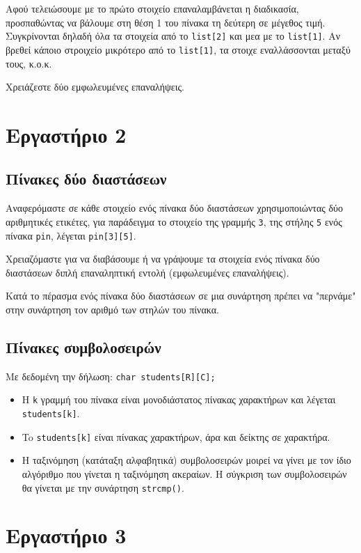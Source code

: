 \documentclass[14pt, fleqn, leqno]{extreport}
\begin{document}
Αφού τελειώσουμε με το πρώτο στοιχείο επαναλαμβάνεται η διαδικασία, προσπαθώντας να βάλουμε στη θέση 1 του πίνακα τη δεύτερη σε μέγεθος τιμή. Συγκρίνονται δηλαδή όλα τα στοιχεία από το \lstinline{list[2]} και μεα με το \lstinline{list[1]}. Αν βρεθεί κάποιο στροιχείο μικρότερο από το \lstinline{list[1]}, τα στοιχε εναλλάσσονται μεταξύ τους, κ.ο.κ.

Χρειάζεστε δύο εμφωλευμένες επαναλήψεις.

\chapter{Εργαστήριο 2}

\section{Πίνακες δύο διαστάσεων}

Αναφερόμαστε σε κάθε στοιχείο ενός πίνακα δύο διαστάσεων χρησιμοποιώντας δύο αριθμητικές ετικέτες, για παράδειγμα το στοιχείο της γραμμής \lstinline{3}, της στήλης \lstinline{5} ενός πίνακα \lstinline{pin}, λέγεται \lstinline{pin[3][5]}.

Χρειαζόμαστε για να διαβάσουμε ή να γράψουμε τα στοιχεία ενός πίνακα δύο διαστάσεων διπλή επαναληπτική εντολή (εμφωλευμένες επαναλήψεις).

Κατά το πέρασμα ενός πίνακα δύο διαστάσεων σε μια συνάρτηση πρέπει να "περνάμε" στην συνάρτηση τον αριθμό των στηλών του πίνακα.

\section{Πίνακες συμβολοσειρών}

Με δεδομένη την δήλωση: \lstinline{char students[R][C];}
\begin{itemize}
    \item Η \lstinline{k} γραμμή του πίνακα είναι μονοδιάστατος πίνακας χαρακτήρων και λέγεται\\\lstinline{students[k]}.
    \item To \lstinline{students[k]} είναι πίνακας χαρακτήρων, άρα και δείκτης σε χαρακτήρα.
    \item Η ταξινόμηση (κατάταξη αλφαβητικά) συμβολοσειρών μοιρεί να γίνει με τον ίδιο αλγόριθμο που γίνεται η ταξινόμηση ακεραίων. Η σύγκριση των συμβολοσειρών θα γίνεται με την συνάρτηση \lstinline{strcmp()}.
\end{itemize}

\chapter{Εργαστήριο 3}
\end{document}
